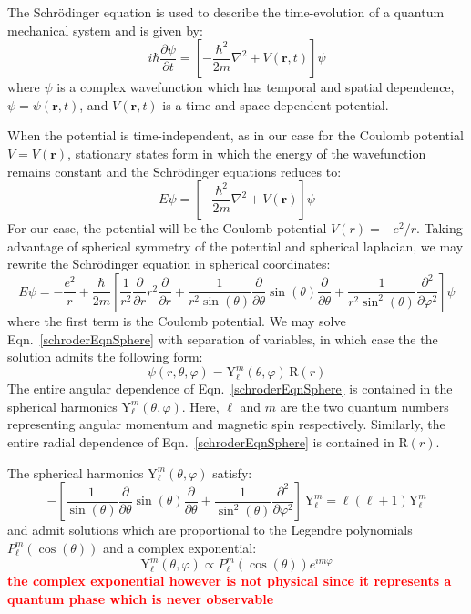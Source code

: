 \documentclass[12pt]{article}
\renewcommand{\vec}[1]{\mathbf{#1}} %
\newcommand{\red}[1]{\textbf{\textcolor{red}{#1}}} %
\newcommand{\ppd}[1]{\frac{\partial}{\partial#1}}
\newcommand{\ppsd}[1]{\frac{\partial^2}{\partial #1^2}}
\newcommand{\ppnd}[2]{\frac{\partial #1}{\partial #2}}
\newcommand{\lap}{\nabla^2}
\let\originaleqref=\eqref
\renewcommand{\eqref}{Eqn.\ \originaleqref}
\begin{document}
	
	\hrulefill
	
	The Schr\"odinger equation is used to describe the time-evolution of a quantum mechanical system and is given by:
	\begin{equation}
	\label{schrodingerEqn1}
		i\hbar\ppnd{\psi}{t} = \left[-\frac{\hbar^2}{2m}\lap+ V(\vec{r},t)\right] \psi
	\end{equation}
	where $\psi$ is a complex wavefunction which has temporal and spatial dependence, $\psi = \psi{(\vec{r},t)}$, and $V(\vec{r},t)$ is a time and space dependent potential.
	
	When the potential is time-independent, as in our case for the Coulomb potential $V = V(\vec{r})$, stationary states form in which the energy of the wavefunction remains constant and the Schr\"odinger equations reduces to:
	\begin{equation}
	\label{schrodingerEqn2}
		E \psi = \left[-\frac{\hbar^2}{2m}\lap + V(\vec{r})\right] \psi
	\end{equation}
	For our case, the potential will be the Coulomb potential $V(r) = -e^2/r$. Taking advantage of spherical symmetry of the potential and spherical laplacian, we may rewrite the Schr\"odinger equation in spherical coordinates:
	\begin{equation}
	\label{schroderEqnSphere}
		E \psi = -\frac{e^2}{r} + \frac{\hbar}{2m} \left[ \frac{1}{r^2} \ppd{r}r^2 \ppd{r} + \frac{1}{r^2\sin(\theta)}\ppd{\theta}\sin(\theta)\ppd{\theta} + \frac{1}{r^2\sin^2(\theta)} \ppsd{\varphi} \right] \psi 
	\end{equation}
	where the first term is the Coulomb potential. We may solve \eqref{schroderEqnSphere} with separation of variables, in which case the the solution admits the following form:
	\begin{equation}
		\psi(r,\theta,\varphi) = \mathrm{Y}_\ell^m(\theta,\varphi) \, \mathrm{R}(r)
	\end{equation}
	The entire angular dependence of \eqref{schroderEqnSphere} is contained in the spherical harmonics $\mathrm{Y}_\ell^m(\theta,\varphi)$. Here, $\ell$ and $m$ are the two quantum numbers representing angular momentum and magnetic spin respectively. Similarly, the entire radial dependence of \eqref{schroderEqnSphere} is contained in $\mathrm{R}(r)$.
	
	The spherical harmonics $\mathrm{Y}_\ell^m(\theta,\varphi)$ satisfy:
	\begin{equation}
	\label{sphericalHarmonic}
		-\left[ \frac{1}{\sin(\theta)}\ppd{\theta}\sin(\theta)\ppd{\theta} + \frac{1}{\sin^2(\theta)} \ppsd{\varphi} \right] \, \mathrm{Y}_\ell^m = \ell(\ell+1)\mathrm{Y}_\ell^m
	\end{equation}
	and admit solutions which are proportional to the Legendre polynomials $P_\ell^m(\cos(\theta))$ and a complex exponential:
	\begin{equation}
		\mathrm{Y}_\ell^m(\theta,\varphi) \propto P_\ell^m(\cos(\theta))e^{im\varphi}
	\end{equation}
	\red{the complex exponential however is not physical since it represents a quantum phase which is never observable}
	
\end{document}

